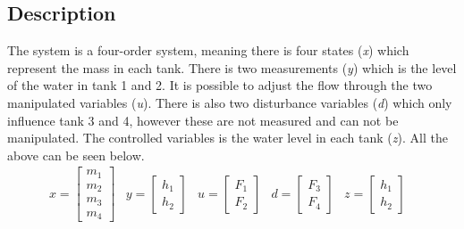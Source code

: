 \subsection{Description}
The system is a four-order system, meaning there is four states (\textit{x}) which represent the mass in each tank. There is two measurements (\textit{y}) which is the level of the water in tank 1 and 2. It is possible to adjust the flow through the two manipulated variables (\textit{u}). There is also two disturbance variables (\textit{d}) which only influence tank 3 and 4, however these are not measured and can not be manipulated. The controlled variables is the water level in each tank (\textit{z}). All the above can be seen below.
\begin{equation}
    \begin{matrix}
        x=
        \begin{bmatrix}
            m_1 \\ m_2 \\ m_3 \\ m_4
        \end{bmatrix} &
        y=        
        \begin{bmatrix}
            h_1 \\ h_2
        \end{bmatrix} &
        u= 
        \begin{bmatrix}
            F_1 \\ F_2
        \end{bmatrix} &
        d= 
        \begin{bmatrix}
            F_3 \\ F_4
        \end{bmatrix} &
        z= 
        \begin{bmatrix}
            h_1 \\ h_2
        \end{bmatrix} &
    \end{matrix}
\end{equation}